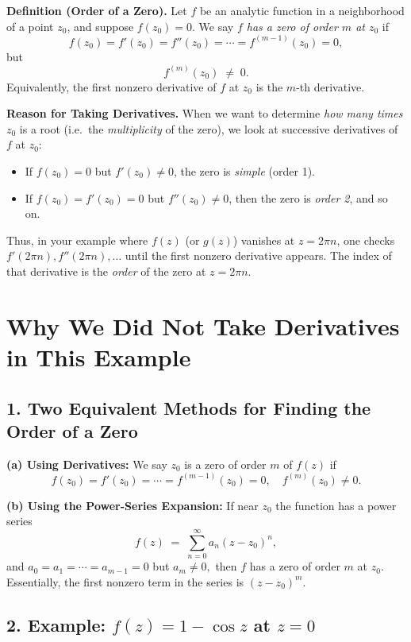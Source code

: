 \documentclass[12pt]{article}
\theoremstyle{definition} %
\theoremstyle{plain} %
\begin{document}
\textbf{Definition (Order of a Zero).}  
Let $f$ be an analytic function in a neighborhood of a point $z_0$, and suppose $f(z_0)=0$. We say \emph{$f$ has a zero of order $m$ at $z_0$} if
\[
f(z_0) = f'(z_0) = f''(z_0) = \cdots = f^{(m-1)}(z_0) = 0,
\]
but
\[
f^{(m)}(z_0) \;\neq\; 0.
\]
Equivalently, the first nonzero derivative of $f$ at $z_0$ is the $m$-th derivative.

\medskip

\textbf{Reason for Taking Derivatives.}  
When we want to determine \emph{how many times} $z_0$ is a root (i.e.\ the \emph{multiplicity} of the zero), we look at successive derivatives of $f$ at $z_0$:
\begin{itemize}
  \item If $f(z_0) = 0$ but $f'(z_0) \neq 0$, the zero is \emph{simple} (order 1).
  \item If $f(z_0) = f'(z_0) = 0$ but $f''(z_0)\neq 0$, then the zero is \emph{order 2}, and so on.
\end{itemize}

Thus, in your example where $f(z)$ (or $g(z)$) vanishes at $z = 2\pi n$, one checks $f'(2\pi n), f''(2\pi n), \dots$ until the first nonzero derivative appears.  The index of that derivative is the \emph{order} of the zero at $z=2\pi n$.
\section*{Why We Did Not Take Derivatives in This Example}

\subsection*{1. Two Equivalent Methods for Finding the Order of a Zero}

\textbf{(a) Using Derivatives:}  
We say $z_0$ is a zero of order $m$ of $f(z)$ if
\[
f(z_0) = f'(z_0) = \cdots = f^{(m-1)}(z_0) = 0,
\quad
f^{(m)}(z_0) \neq 0.
\]

\textbf{(b) Using the Power-Series Expansion:}  
If near $z_0$ the function has a power series
\[
f(z) \;=\;\sum_{n=0}^{\infty} a_n (z - z_0)^n,
\]
and $a_0 = a_1 = \cdots = a_{m-1} = 0$ but $a_m \neq 0,$ then $f$ has a zero of order $m$ at $z_0$. Essentially, the first nonzero term in the series is $(z - z_0)^m$.

\subsection*{2. Example: $f(z) = 1 - \cos z$ at $z=0$}
\end{document}
